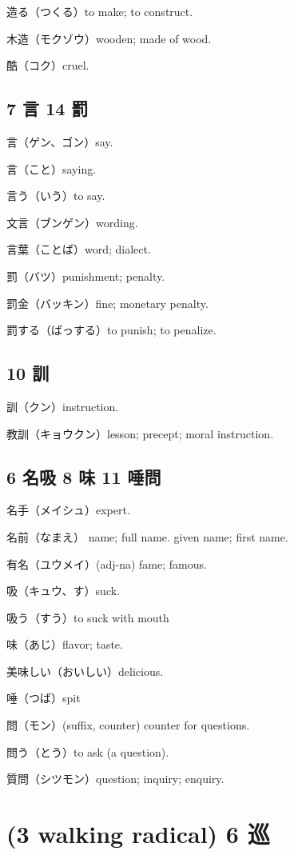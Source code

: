 造る（つくる）to make; to construct.

木造（モクゾウ）wooden; made of wood.

酷（コク）cruel.

\subsection{7 言 14 罰}

言（ゲン、ゴン）say.

言（こと）saying.

言う（いう）to say.

文言（ブンゲン）wording.

言葉（ことば）word; dialect.

罰（バツ）punishment; penalty.

罰金（バッキン）fine; monetary penalty.

罰する（ばっする）to punish; to penalize.

\subsection{10 訓}

訓（クン）instruction.

教訓（キョウクン）lesson; precept; moral instruction.

\subsection{6 名吸 8 味 11 唾問}

名手（メイシュ）expert.

名前（なまえ）
name; full name.
given name; first name.

有名（ユウメイ）(adj-na) fame; famous.

吸（キュウ、す）suck.

吸う（すう）to suck with mouth

味（あじ）flavor; taste.

美味しい（おいしい）delicious.

唾（つば）spit

問（モン）(suffix, counter) counter for questions.

問う（とう）to ask (a question).

質問（シツモン）question; inquiry; enquiry.

\section{(3 walking radical) 6 巡}

